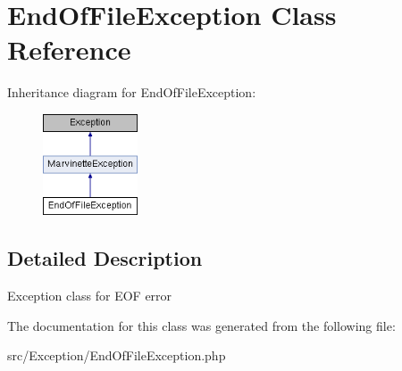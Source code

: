 \hypertarget{classEndOfFileException}{}\section{End\+Of\+File\+Exception Class Reference}
\label{classEndOfFileException}
Inheritance diagram for End\+Of\+File\+Exception\+:\begin{figure}[H]
\begin{center}
\leavevmode
\includegraphics[height=3.000000cm]{classEndOfFileException}
\end{center}
\end{figure}


\subsection{Detailed Description}
Exception class for E\+OF error 

The documentation for this class was generated from the following file\+:\begin{DoxyCompactItemize}
\item 
src/\+Exception/End\+Of\+File\+Exception.\+php\end{DoxyCompactItemize}
